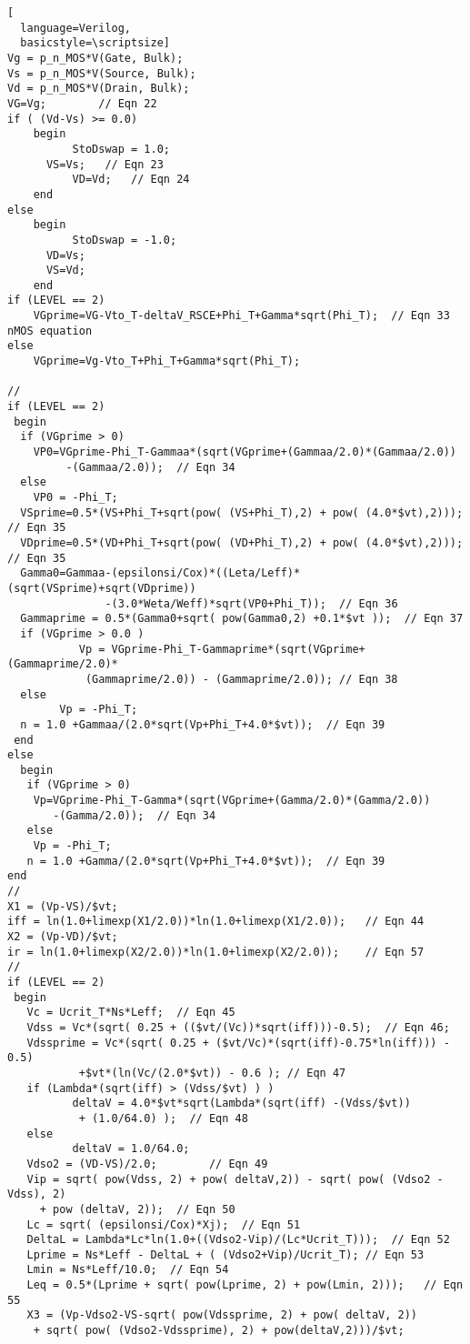 \begin{lstlisting}[
  language=Verilog,
  basicstyle=\scriptsize]
Vg = p_n_MOS*V(Gate, Bulk); 
Vs = p_n_MOS*V(Source, Bulk);
Vd = p_n_MOS*V(Drain, Bulk);
VG=Vg;        // Eqn 22
if ( (Vd-Vs) >= 0.0)
	begin
          StoDswap = 1.0;
	  VS=Vs;   // Eqn 23
          VD=Vd;   // Eqn 24
	end
else
	begin
          StoDswap = -1.0;
	  VD=Vs;
	  VS=Vd;
	end
if (LEVEL == 2)
    VGprime=VG-Vto_T-deltaV_RSCE+Phi_T+Gamma*sqrt(Phi_T);  // Eqn 33  nMOS equation
else
    VGprime=Vg-Vto_T+Phi_T+Gamma*sqrt(Phi_T);

//
if (LEVEL == 2)
 begin
  if (VGprime > 0)
	VP0=VGprime-Phi_T-Gammaa*(sqrt(VGprime+(Gammaa/2.0)*(Gammaa/2.0))
	     -(Gammaa/2.0));  // Eqn 34
  else
	VP0 = -Phi_T;
  VSprime=0.5*(VS+Phi_T+sqrt(pow( (VS+Phi_T),2) + pow( (4.0*$vt),2)));  // Eqn 35
  VDprime=0.5*(VD+Phi_T+sqrt(pow( (VD+Phi_T),2) + pow( (4.0*$vt),2)));  // Eqn 35
  Gamma0=Gammaa-(epsilonsi/Cox)*((Leta/Leff)*(sqrt(VSprime)+sqrt(VDprime))
               -(3.0*Weta/Weff)*sqrt(VP0+Phi_T));  // Eqn 36
  Gammaprime = 0.5*(Gamma0+sqrt( pow(Gamma0,2) +0.1*$vt ));  // Eqn 37 
  if (VGprime > 0.0 )
           Vp = VGprime-Phi_T-Gammaprime*(sqrt(VGprime+(Gammaprime/2.0)*
	        (Gammaprime/2.0)) - (Gammaprime/2.0)); // Eqn 38
  else
        Vp = -Phi_T;
  n = 1.0 +Gammaa/(2.0*sqrt(Vp+Phi_T+4.0*$vt));  // Eqn 39
 end
else
  begin
   if (VGprime > 0)
	Vp=VGprime-Phi_T-Gamma*(sqrt(VGprime+(Gamma/2.0)*(Gamma/2.0))
	   -(Gamma/2.0));  // Eqn 34
   else
	Vp = -Phi_T;
   n = 1.0 +Gamma/(2.0*sqrt(Vp+Phi_T+4.0*$vt));  // Eqn 39
end
//
X1 = (Vp-VS)/$vt;
iff = ln(1.0+limexp(X1/2.0))*ln(1.0+limexp(X1/2.0));   // Eqn 44
X2 = (Vp-VD)/$vt;
ir = ln(1.0+limexp(X2/2.0))*ln(1.0+limexp(X2/2.0));    // Eqn 57
//
if (LEVEL == 2)
 begin
   Vc = Ucrit_T*Ns*Leff;  // Eqn 45
   Vdss = Vc*(sqrt( 0.25 + (($vt/(Vc))*sqrt(iff)))-0.5);  // Eqn 46;
   Vdssprime = Vc*(sqrt( 0.25 + ($vt/Vc)*(sqrt(iff)-0.75*ln(iff))) - 0.5) 
	       +$vt*(ln(Vc/(2.0*$vt)) - 0.6 ); // Eqn 47
   if (Lambda*(sqrt(iff) > (Vdss/$vt) ) )
          deltaV = 4.0*$vt*sqrt(Lambda*(sqrt(iff) -(Vdss/$vt)) 
		   + (1.0/64.0) );  // Eqn 48
   else   
          deltaV = 1.0/64.0;
   Vdso2 = (VD-VS)/2.0;        // Eqn 49
   Vip = sqrt( pow(Vdss, 2) + pow( deltaV,2)) - sqrt( pow( (Vdso2 - Vdss), 2) 
	 + pow (deltaV, 2));  // Eqn 50
   Lc = sqrt( (epsilonsi/Cox)*Xj);  // Eqn 51
   DeltaL = Lambda*Lc*ln(1.0+((Vdso2-Vip)/(Lc*Ucrit_T)));  // Eqn 52
   Lprime = Ns*Leff - DeltaL + ( (Vdso2+Vip)/Ucrit_T); // Eqn 53
   Lmin = Ns*Leff/10.0;  // Eqn 54
   Leq = 0.5*(Lprime + sqrt( pow(Lprime, 2) + pow(Lmin, 2)));   // Eqn 55
   X3 = (Vp-Vdso2-VS-sqrt( pow(Vdssprime, 2) + pow( deltaV, 2)) 
	+ sqrt( pow( (Vdso2-Vdssprime), 2) + pow(deltaV,2)))/$vt;

\end{lstlisting}
